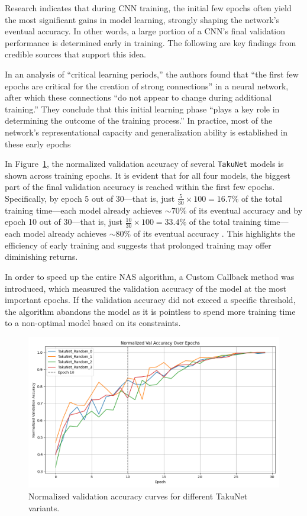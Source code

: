 Research indicates that during CNN training, the initial few epochs often yield the most significant gains in model learning, strongly shaping the network’s eventual accuracy. In other words, a large portion of a CNN’s final validation performance is determined early in training. The following are key findings from credible sources that support this idea.

In an analysis of “critical learning periods,” the authors found that “the first few epochs are critical for the creation of strong connections” in a neural network, after which these connections “do not appear to change during additional training.” They conclude that this initial learning phase “plays a key role in determining the outcome of the training process.” In practice, most of the network’s representational capacity and generalization ability is established in these early epochs \cite{achille2017critical}

In Figure~\ref{fig:val_accuracy}, the normalized validation accuracy of several \texttt{TakuNet} models is shown across training epochs. It is evident that for all four models, the biggest part of the final validation accuracy is reached within the first few epochs. Specifically, by epoch 5 out of 30—that is, just \( \frac{5}{30} \times 100 = 16.7\% \) of the total training time—each model already achieves $\sim 70\%$ of its eventual accuracy and by epoch 10 out of 30—that is, just \( \frac{10}{30} \times 100 = 33.4\% \)  of the total training time—each model already achieves $\sim 80\%$ of its eventual accuracy . This highlights the efficiency of early training and suggests that prolonged training may offer diminishing returns.


In order to speed up the entire NAS algorithm, a Custom Callback method was introduced, which measured the validation accuracy of the model at the most important epochs. If the validation accuracy did not exceed a specific threshold, the algorithm abandons the model as it is pointless to spend more training time to a non-optimal model based on its constraints.

\begin{figure}[ht]
    \centering
    \includegraphics[width=0.85\linewidth]{Pictures/val_accuracy_comparison.png}
    \caption{Normalized validation accuracy curves for different TakuNet variants.}
    \label{fig:val_accuracy}
\end{figure}

